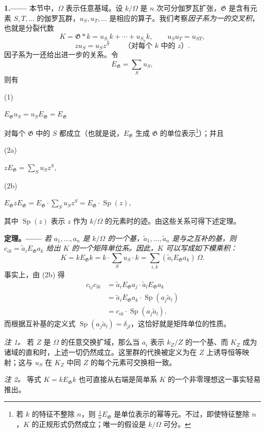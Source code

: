 \documentclass[11pt]{article}
\providecommand{\Gg}{\mathfrak G}
\providecommand{\Sp}{\operatorname{Sp}}
\providecommand{\srcnumdisplay}[3][3.4em]{%
  \par\smallskip\noindent
  \begin{minipage}[t]{#1}\vspace*{0pt}#2\end{minipage}%
  \begin{minipage}[t]{\dimexpr\linewidth-#1\relax}\vspace*{0pt}\centering
  \(\displaystyle #3\)
  \end{minipage}\par\smallskip}
\begin{document}
\noindent\textbf{1.——} 本节中，\(\Omega\) 表示任意基域。设 \(k/\Omega\) 是 \(n\) 次可分伽罗瓦扩张，\(\Gg\) 是含有元素 \(S,T,\ldots\) 的伽罗瓦群，\(u_S,u_T,\ldots\) 是相应的算子。我们考察\emph{因子系为一的交叉积}，也就是分裂代数
\[
K=\Gg\ast k=u_{S_1}k+\cdots+u_{S_n}k,
\qquad u_Su_T=u_{ST},
\]
\[
zu_S=u_Sz^S\qquad\text{（对每个 \(k\) 中的 \(z\)）}.
\]
因子系为一还给出进一步的关系。令
\[
E_\Gg=\sum_Su_S,
\]
则有
\srcnumdisplay{(1)}{E_\Gg u_S=u_SE_\Gg=E_\Gg}
对每个 \(\Gg\) 中的 \(S\) 都成立（也就是说，\(E_\Gg\) 生成 \(\Gg\) 的单位表示\footnote{若 \(k\) 的特征不整除 \(n\)，则 \(\frac1nE_\Gg\) 是单位表示的幂等元。不过，即使特征整除 \(n\)，\(K\) 的正规形式仍然成立；唯一的假设是 \(k/\Omega\) 可分。}）；并且
\srcnumdisplay{(2a)}{zE_\Gg=\sum_Su_Sz^S,}
\srcnumdisplay{(2b)}{E_\Gg zE_\Gg=E_\Gg\cdot\sum_Su_Sz^S
  =E_\Gg\cdot\Sp(z),}
其中 \(\Sp(z)\) 表示 \(z\) 作为 \(k/\Omega\) 的元素时的迹。由这些关系可得下述定理。

\medskip
\noindent\textbf{定理。——} \emph{若 \(a_1,\ldots,a_n\) 是 \(k/\Omega\) 的一个基，\(\widetilde a_1,\ldots,\widetilde a_n\) 是与之互补的基，则
\(c_{ik}=\widetilde a_iE_\Gg a_k\) 给出 \(K\) 的一个矩阵单位系。因此，\(K\) 可以写成如下模乘积：}
\[
K=kE_\Gg k=k\cdot\sum_Su_S\cdot k
 =\sum_{i,k}(\widetilde a_iE_\Gg a_k)\,\Omega.
\]
事实上，由 (2b) 得
\[
\begin{aligned}
c_{ij}c_{lk}
 &=\widetilde a_iE_\Gg a_j\cdot\widetilde a_lE_\Gg a_k\\
 &=\widetilde a_iE_\Gg a_k\cdot\Sp(a_j\widetilde a_l)\\
 &=c_{ik}\cdot\Sp(a_j\widetilde a_l).
\end{aligned}
\]
而根据互补基的定义式 \(\Sp(a_j\widetilde a_l)=\delta_{jl}\)，这恰好就是矩阵单位的性质。

\emph{注 1。} 若 \(Z\) 是 \(\Omega\) 的任意交换扩域，那么当 \(a_i\) 表示 \(k_Z/Z\) 的一个基、而 \(K_Z\) 成为诸域的直和时，上述一切仍然成立。这里群的代换被定义为在 \(Z\) 上诱导恒等映射；这与 \(u_S\) 在 \(K_Z\) 中同 \(Z\) 的每个元素可交换相一致。

\emph{注 2。} 等式 \(K=kE_\Gg k\) 也可直接从右端是简单系 \(K\) 的一个非零理想这一事实轻易推出。
\end{document}
